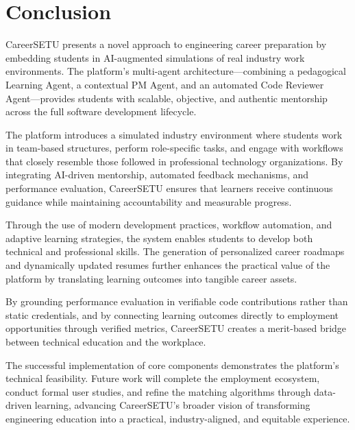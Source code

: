 \documentclass[12pt,a4paper]{report}
\begin{document}

\chapter{Conclusion}

CareerSETU presents a novel approach to engineering career preparation by embedding students in AI-augmented simulations of real industry work environments. The platform's multi-agent architecture---combining a pedagogical Learning Agent, a contextual PM Agent, and an automated Code Reviewer Agent---provides students with scalable, objective, and authentic mentorship across the full software development lifecycle.

The platform introduces a simulated industry environment where students work in team-based structures, perform role-specific tasks, and engage with workflows that closely resemble those followed in professional technology organizations. By integrating AI-driven mentorship, automated feedback mechanisms, and performance evaluation, CareerSETU ensures that learners receive continuous guidance while maintaining accountability and measurable progress.

Through the use of modern development practices, workflow automation, and adaptive learning strategies, the system enables students to develop both technical and professional skills. The generation of personalized career roadmaps and dynamically updated resumes further enhances the practical value of the platform by translating learning outcomes into tangible career assets.

By grounding performance evaluation in verifiable code contributions rather than static credentials, and by connecting learning outcomes directly to employment opportunities through verified metrics, CareerSETU creates a merit-based bridge between technical education and the workplace.

The successful implementation of core components demonstrates the platform's technical feasibility. Future work will complete the employment ecosystem, conduct formal user studies, and refine the matching algorithms through data-driven learning, advancing CareerSETU's broader vision of transforming engineering education into a practical, industry-aligned, and equitable experience.

\end{document}
